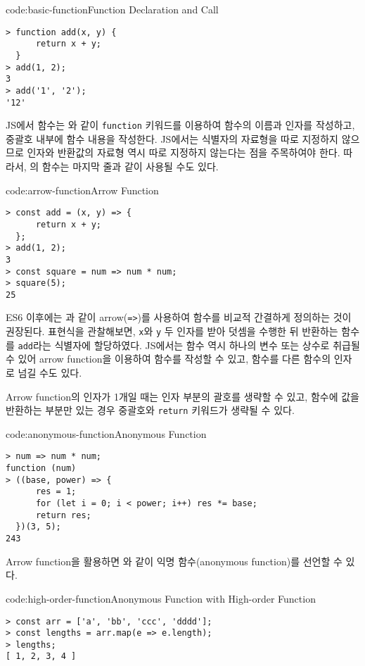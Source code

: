 \begin{codeenv}{code:basic-function}{Function Declaration and Call}\begin{verbatim}
> function add(x, y) {
      return x + y;
  }
> add(1, 2);
3
> add('1', '2');
'12'
\end{verbatim}
\end{codeenv}

JS에서 함수는 와 같이 \texttt{function} 키워드를 이용하여 함수의 이름과 인자를 작성하고, 중괄호 내부에 함수 내용을 작성한다. JS에서는 식별자의 자료형을 따로 지정하지 않으므로 인자와 반환값의 자료형 역시 따로 지정하지 않는다는 점을 주목하여야 한다. 따라서, 의 함수는 마지막 줄과 같이 사용될 수도 있다.

\begin{codeenv}{code:arrow-function}{Arrow Function}\begin{verbatim}
> const add = (x, y) => {
      return x + y;
  };
> add(1, 2);
3
> const square = num => num * num;
> square(5);
25
\end{verbatim}
\end{codeenv}

ES6 이후에는 과 같이 arrow(\texttt{=>})를 사용하여 함수를 비교적 간결하게 정의하는 것이 권장된다. 표현식을 관찰해보면, \texttt{x}와 \texttt{y} 두 인자를 받아 덧셈을 수행한 뒤 반환하는 함수를 \texttt{add}라는 식별자에 할당하였다. JS에서는 함수 역시 하나의 변수 또는 상수로 취급될 수 있어 arrow function을 이용하여 함수를 작성할 수 있고, 함수를 다른 함수의 인자로 넘길 수도 있다.

Arrow function의 인자가 1개일 때는 인자 부분의 괄호를 생략할 수 있고, 함수에 값을 반환하는 부분만 있는 경우 중괄호와 \texttt{return} 키워드가 생략될 수 있다.

\begin{codeenv}{code:anonymous-function}{Anonymous Function}\begin{verbatim}
> num => num * num;
function (num)
> ((base, power) => {
      res = 1;
      for (let i = 0; i < power; i++) res *= base;
      return res;
  })(3, 5);
243
\end{verbatim}
\end{codeenv}

Arrow function을 활용하면 와 같이 익명 함수(anonymous function)를 선언할 수 있다.

\begin{codeenv}{code:high-order-function}{Anonymous Function with High-order Function}\begin{verbatim}
> const arr = ['a', 'bb', 'ccc', 'dddd'];
> const lengths = arr.map(e => e.length);
> lengths;
[ 1, 2, 3, 4 ]
\end{verbatim}
\end{codeenv}

